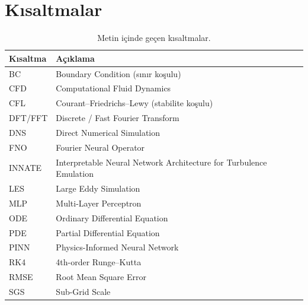 \section{Kısaltmalar}
\label{sec:kisaltmalar}

\begin{table}[H]
\centering
\caption{Metin içinde geçen kısaltmalar.}
\label{tab:kisaltmalar}
\begin{tabular}{ll}
\toprule
\textbf{Kısaltma} & \textbf{Açıklama} \\
\midrule
BC       & Boundary Condition (sınır koşulu) \\
CFD      & Computational Fluid Dynamics \\
CFL      & Courant--Friedrichs--Lewy (stabilite koşulu) \\
DFT/FFT  & Discrete / Fast Fourier Transform \\
DNS      & Direct Numerical Simulation \\
FNO      & Fourier Neural Operator \\
INNATE   & Interpretable Neural Network Architecture for Turbulence Emulation \\
LES      & Large Eddy Simulation \\
MLP      & Multi-Layer Perceptron \\
ODE      & Ordinary Differential Equation \\
PDE      & Partial Differential Equation \\
PINN     & Physics-Informed Neural Network \\
RK4      & 4th-order Runge--Kutta \\
RMSE     & Root Mean Square Error \\
SGS      & Sub-Grid Scale \\
\bottomrule
\end{tabular}
\end{table}
